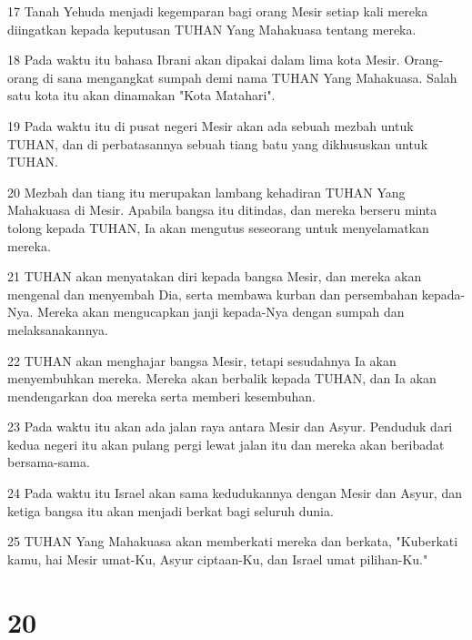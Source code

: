 \par 17 Tanah Yehuda menjadi kegemparan bagi orang Mesir setiap kali mereka diingatkan kepada keputusan TUHAN Yang Mahakuasa tentang mereka.
\par 18 Pada waktu itu bahasa Ibrani akan dipakai dalam lima kota Mesir. Orang-orang di sana mengangkat sumpah demi nama TUHAN Yang Mahakuasa. Salah satu kota itu akan dinamakan "Kota Matahari".
\par 19 Pada waktu itu di pusat negeri Mesir akan ada sebuah mezbah untuk TUHAN, dan di perbatasannya sebuah tiang batu yang dikhususkan untuk TUHAN.
\par 20 Mezbah dan tiang itu merupakan lambang kehadiran TUHAN Yang Mahakuasa di Mesir. Apabila bangsa itu ditindas, dan mereka berseru minta tolong kepada TUHAN, Ia akan mengutus seseorang untuk menyelamatkan mereka.
\par 21 TUHAN akan menyatakan diri kepada bangsa Mesir, dan mereka akan mengenal dan menyembah Dia, serta membawa kurban dan persembahan kepada-Nya. Mereka akan mengucapkan janji kepada-Nya dengan sumpah dan melaksanakannya.
\par 22 TUHAN akan menghajar bangsa Mesir, tetapi sesudahnya Ia akan menyembuhkan mereka. Mereka akan berbalik kepada TUHAN, dan Ia akan mendengarkan doa mereka serta memberi kesembuhan.
\par 23 Pada waktu itu akan ada jalan raya antara Mesir dan Asyur. Penduduk dari kedua negeri itu akan pulang pergi lewat jalan itu dan mereka akan beribadat bersama-sama.
\par 24 Pada waktu itu Israel akan sama kedudukannya dengan Mesir dan Asyur, dan ketiga bangsa itu akan menjadi berkat bagi seluruh dunia.
\par 25 TUHAN Yang Mahakuasa akan memberkati mereka dan berkata, "Kuberkati kamu, hai Mesir umat-Ku, Asyur ciptaan-Ku, dan Israel umat pilihan-Ku."

\chapter{20}

